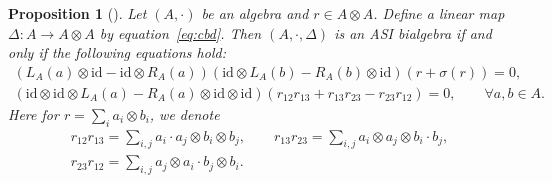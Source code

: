 \documentclass[10pt,a4paper]{amsart}
\numberwithin{equation}{section}
\newtheorem{Proposition}[Theorem]{Proposition}
{ \theoremstyle{definition}
	\newtheorem{Definition}[Theorem]{Definition}
	\newtheorem{Note}[Theorem]{Note}
	\newtheorem{Example}[Theorem]{Example}
	\newtheorem{Remark}[Theorem]{Remark} }
\newcommand{\id}{\mathrm{id}}
\begin{document}
\begin{Proposition}[{\cite[Theorem~2.3.5]{BaiDouble}}]\label{pro:cobasi}
Let $(A, \cdot)$ be an algebra and $r \in A \otimes A$.
 Define a linear map $\Delta\colon A \to A \otimes A$ by equation~\eqref{eq:cbd}.
 Then $(A, \cdot, \Delta)$ is an ASI bialgebra if and only if the following equations hold:
 \begin{gather}
 (L_A(a) \otimes \id - \id \otimes R_A(a))(\id \otimes L_A(b) - R_A(b) \otimes \id)(r + \sigma(r)) = 0, \label{eq:cobanti} \\
 (\id \otimes \id \otimes L_A(a) - R_A(a) \otimes \id \otimes \id)(r_{12}r_{13}+r_{13}r_{23}-r_{23}r_{12}) = 0, \qquad \forall a,b\in A. \label{eq:cobcoa}
 \end{gather}
 Here for $r = \sum_i a_i \otimes b_i$, we denote
 \begin{gather*}
 r_{12} r_{13} = \sum_{i,j} a_i \cdot a_j \otimes b_i \otimes b_j, \qquad
 r_{13} r_{23} = \sum_{i,j} a_i \otimes a_j \otimes b_i \cdot b_j, \\
 r_{23} r_{12} = \sum_{i,j} a_j \otimes a_i \cdot b_j \otimes b_i.
 \end{gather*}
\end{Proposition}
\end{document}
